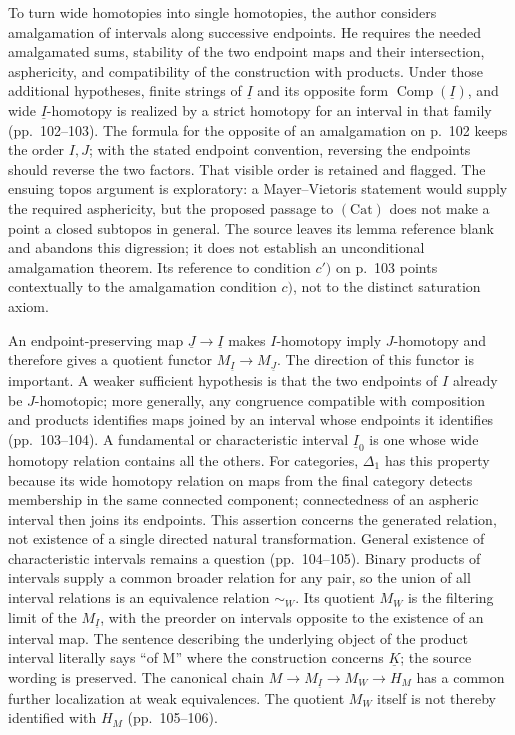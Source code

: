 To turn wide homotopies into single homotopies, the author considers amalgamation of intervals along successive endpoints. He requires the needed amalgamated sums, stability of the two endpoint maps and their intersection, asphericity, and compatibility of the construction with products. Under those additional hypotheses, finite strings of $\underline I$ and its opposite form $\operatorname{Comp}(\underline I)$, and wide $\underline I$-homotopy is realized by a strict homotopy for an interval in that family (pp.~102--103). The formula for the opposite of an amalgamation on p.~102 keeps the order $I,J$; with the stated endpoint convention, reversing the endpoints should reverse the two factors. That visible order is retained and flagged. The ensuing topos argument is exploratory: a Mayer--Vietoris statement would supply the required asphericity, but the proposed passage to $(\mathrm{Cat})$ does not make a point a closed subtopos in general. The source leaves its lemma reference blank and abandons this digression; it does not establish an unconditional amalgamation theorem. Its reference to condition $c')$ on p.~103 points contextually to the amalgamation condition $c)$, not to the distinct saturation axiom.

An endpoint-preserving map $\underline J\to\underline I$ makes $I$-homotopy imply $J$-homotopy and therefore gives a quotient functor $M_{\underline I}\to M_{\underline J}$. The direction of this functor is important. A weaker sufficient hypothesis is that the two endpoints of $I$ already be $J$-homotopic; more generally, any congruence compatible with composition and products identifies maps joined by an interval whose endpoints it identifies (pp.~103--104). A fundamental or characteristic interval $\underline I_0$ is one whose wide homotopy relation contains all the others. For categories, $\Delta_1$ has this property because its wide homotopy relation on maps from the final category detects membership in the same connected component; connectedness of an aspheric interval then joins its endpoints. This assertion concerns the generated relation, not existence of a single directed natural transformation. General existence of characteristic intervals remains a question (pp.~104--105). Binary products of intervals supply a common broader relation for any pair, so the union of all interval relations is an equivalence relation $\sim_W$. Its quotient $M_W$ is the filtering limit of the $M_{\underline I}$, with the preorder on intervals opposite to the existence of an interval map. The sentence describing the underlying object of the product interval literally says ``of M'' where the construction concerns $\underline K$; the source wording is preserved. The canonical chain $M\to M_{\underline I}\to M_W\to H_M$ has a common further localization at weak equivalences. The quotient $M_W$ itself is not thereby identified with $H_M$ (pp.~105--106).

